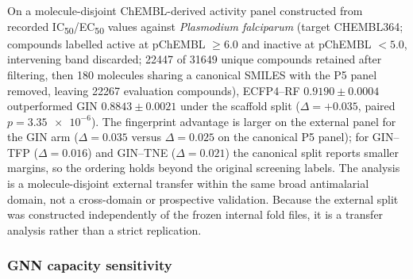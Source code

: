 \documentclass[11pt,a4paper]{article}
\begin{document}
On a molecule-disjoint ChEMBL-derived activity panel constructed from recorded IC\textsubscript{50}/EC\textsubscript{50} values against \emph{Plasmodium falciparum} (target CHEMBL364; compounds labelled active at pChEMBL $\geq \num{6.0}$ and inactive at pChEMBL $< \num{5.0}$, intervening band discarded; \num{22447} of \num{31649} unique compounds retained after filtering, then \num{180} molecules sharing a canonical SMILES with the P5 panel removed, leaving \num{22267} evaluation compounds), ECFP4--RF $\num{0.9190} \pm \num{0.0004}$ outperformed GIN $\num{0.8843} \pm \num{0.0021}$ under the scaffold split ($\Delta = +\num{0.035}$, paired $p = \num{3.35e-6}$). The fingerprint advantage is larger on the external panel for the GIN arm ($\Delta = \num{0.035}$ versus $\Delta = \num{0.025}$ on the canonical P5 panel); for GIN--TFP ($\Delta = \num{0.016}$) and GIN--TNE ($\Delta = \num{0.021}$) the canonical split reports smaller margins, so the ordering holds beyond the original screening labels. The analysis is a molecule-disjoint external transfer within the same broad antimalarial domain, not a cross-domain or prospective validation. Because the external split was constructed independently of the frozen internal fold files, it is a transfer analysis rather than a strict replication.

\subsubsection{GNN capacity sensitivity}
\end{document}
